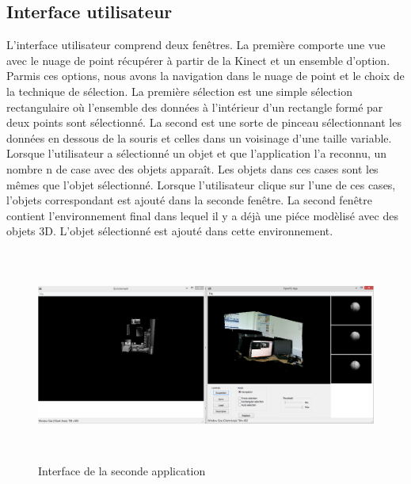 
\subsection{Interface utilisateur}
L'interface utilisateur comprend deux fenêtres. La première comporte une vue avec le nuage de point récupérer à partir de la Kinect
et un ensemble d'option. Parmis ces options, nous avons la navigation dans le nuage de point et le choix de la technique de 
sélection. La première sélection est une simple sélection rectangulaire où l'ensemble des données à l'intérieur d'un rectangle formé
par deux points sont sélectionné. La second est une sorte de pinceau sélectionnant les données en dessous de la souris et celles dans 
un voisinage d'une taille variable. Lorsque l'utilisateur a sélectionné un objet et que l'application l'a reconnu, un nombre n de case 
avec des objets apparaît. Les objets dans ces cases sont les mêmes que l'objet sélectionné. Lorsque l'utilisateur clique sur l'une 
de ces cases, l'objets correspondant est ajouté dans la seconde fenêtre.
La second fenêtre contient l'environnement final dans lequel il y a déjà une piéce modèlisé avec des objets 3D. L'objet sélectionné est 
ajouté dans cette environnement.

\begin{figure}[!h]
  \begin{center}
    \includegraphics[height=7cm]{image/appliObjet.PNG}
    \caption{Interface de la seconde application}
  \end{center}
\end{figure}
